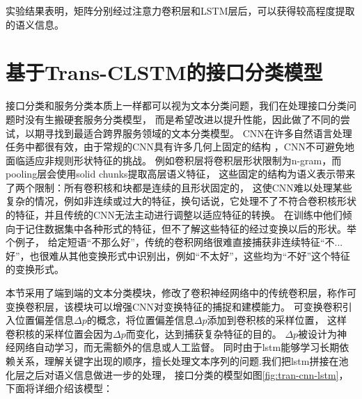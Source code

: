 实验结果表明，矩阵分别经过注意力卷积层和LSTM层后，可以获得较高程度提取的语义信息。



\section{基于Trans-CLSTM的接口分类模型}
接口分类和服务分类本质上一样都可以视为文本分类问题，我们在处理接口分类问题时没有生搬硬套服务分类模型，
而是希望改进以提升性能，因此做了不同的尝试，以期寻找到最适合跨界服务领域的文本分类模型。
CNN在许多自然语言处理任务中都很有效，由于常规的CNN具有许多几何上固定的结构 ，CNN不可避免地面临适应非规则形状特征的挑战。
例如卷积层将卷积层形状限制为n-gram，而pooling层会使用solid chunks提取高层语义特征，
这些固定的结构为语义表示带来了两个限制：所有卷积核和块都是连续的且形状固定的，
这使CNN难以处理某些复杂的情况，例如非连续或过大的特征，换句话说，它处理不了不符合卷积核形状的特征，并且传统的CNN无法主动进行调整以适应特征的转换。
在训练中他们倾向于记住数据集中各种形式的特征，但不了解这些特征的经过变换以后的形状。举个例子，
给定短语“不那么好”，传统的卷积网络很难直接捕获非连续特征“不...好”，也很难从其他变换形式中识别出，例如“不太好”，这些均为“不好”这个特征的变换形式。

本节采用了端到端的文本分类模块，修改了卷积神经网络中的传统卷积层，称作可变换卷积层，该模块可以增强CNN对变换特征的捕捉和建模能力。
可变换卷积引入位置偏差信息$\Delta p$的概念，将位置偏差信息$\Delta p$添加到卷积核的采样位置，
这样卷积核的采样位置会因为$\Delta p$而变化，达到捕获复杂特征的目的。
$\Delta p$被设计为神经网络自动学习，而无需额外的信息或人工监督。
同时由于lstm能够学习长期依赖关系，理解关键字出现的顺序，擅长处理文本序列的问题.我们把lstm拼接在池化层之后对语义信息做进一步的处理，
接口分类的模型如图\ref{fig:tran-cnn-lstm}，下面将详细介绍该模型：

